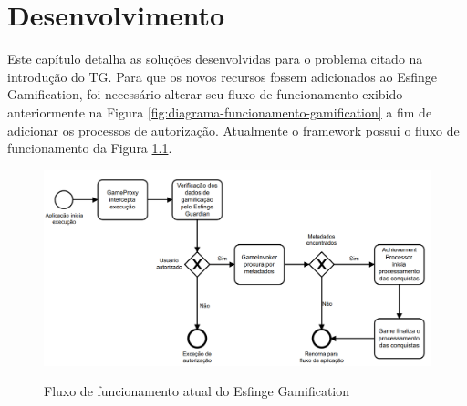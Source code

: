 \newpage
\chapter{Desenvolvimento}
\label{ch:desenvolvimento}




\par Este capítulo detalha as soluções desenvolvidas para o problema citado na introdução do TG. Para que os novos recursos fossem adicionados ao Esfinge Gamification, foi necessário alterar seu fluxo de funcionamento exibido anteriormente na Figura \ref{fig:diagrama-funcionamento-gamification} a fim de adicionar os processos de autorização. Atualmente o  framework possui o fluxo de funcionamento da Figura \ref{fig:fluxo-atual}. 

\begin{figure}[H]
    \centering
    \caption{Fluxo de funcionamento atual do Esfinge Gamification}
    \includegraphics[scale=0.3]{src/imagens/cap3/fluxo-atual.png}
    \label{fig:fluxo-atual}
\end{figure}

